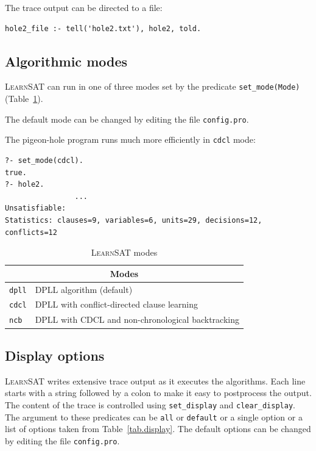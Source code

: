 \documentclass[11pt]{report}
\newcommand*{\p}[1]{\textup{\texttt{#1}}}
\newcommand*{\ls}{\textsc{LearnSAT}}
\begin{document}
The trace output can be directed to a file:

\begin{verbatim}
hole2_file :- tell('hole2.txt'), hole2, told.
\end{verbatim}

\subsection{Algorithmic modes}

\ls{} can run in one of three modes set by the predicate \p{set\_mode(Mode)}
(Table~\ref{tab.modes}).

The default mode can be changed by editing the file \p{config.pro}.

The pigeon-hole program runs much more efficiently in \p{cdcl} mode:
\begin{verbatim}
?- set_mode(cdcl).
true.
?- hole2.
                ...
Unsatisfiable:
Statistics: clauses=9, variables=6, units=29, decisions=12, conflicts=12
\end{verbatim}

\begin{table}[*b]
\begin{center}
\begin{tabular}{|l|l|}
\hline
\multicolumn{2}{|c|}{\textbf{\large Modes}}\\
\hline
\p{dpll} & DPLL algorithm (default)\\
\p{cdcl} & DPLL with conflict-directed clause learning\\
\p{ncb} &  DPLL with CDCL and non-chronological backtracking\\
\hline
\end{tabular}
\caption{\ls{} modes}\label{tab.modes}
\end{center}
\end{table}

\subsection{Display options}

\ls{} writes extensive trace output as it executes the algorithms. Each
line starts with a string followed by a colon to make it easy to
postprocess the output. The content of the trace is controlled using
\p{set\_display} and \p{clear\_display}. The argument to these
predicates can be \p{all} or \p{default} or a single option or a list of
options taken from Table~\ref{tab.display}. The default options can be
changed by editing the file \p{config.pro}.
\end{document}
